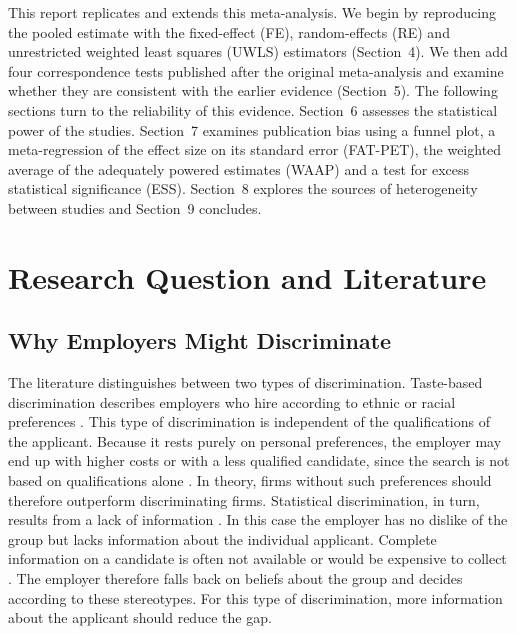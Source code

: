\documentclass[11pt,a4paper]{article}
\begin{document}
This report replicates and extends this meta-analysis. We begin by
reproducing the pooled estimate with the fixed-effect (FE), random-effects
(RE) and unrestricted weighted least squares (UWLS) estimators (Section~4).
We then add four correspondence tests published after the original meta-analysis and examine whether they are consistent with the earlier
evidence (Section~5). The following sections turn to the reliability of
this evidence. Section~6 assesses the statistical power of the studies.
Section~7 examines publication bias using a funnel plot, a meta-regression
of the effect size on its standard error (FAT-PET), the weighted average of
the adequately powered estimates (WAAP) and a test for excess statistical
significance (ESS). Section~8 explores the sources of heterogeneity between
studies and Section~9 concludes.

\section{Research Question and Literature}

\subsection{Why Employers Might Discriminate}

The literature distinguishes between two types of discrimination.
Taste-based discrimination describes employers who hire according to ethnic
or racial preferences \citep{becker1957}. This type of discrimination is
independent of the qualifications of the applicant. Because it rests purely
on personal preferences, the employer may end up with higher costs or with
a less qualified candidate, since the search is not based on qualifications
alone \citep{zschirnt2016}. In theory, firms without such preferences
should therefore outperform discriminating firms. Statistical
discrimination, in turn, results from a lack of information
\citep{phelps1972,arrow1973}. In this case the employer has no dislike of
the group but lacks information about the individual applicant. Complete
information on a candidate is often not available or would be expensive to
collect \citep{zschirnt2016}. The employer therefore falls back on beliefs
about the group and decides according to these stereotypes. For this type
of discrimination, more information about the applicant should reduce the
gap.
\end{document}
